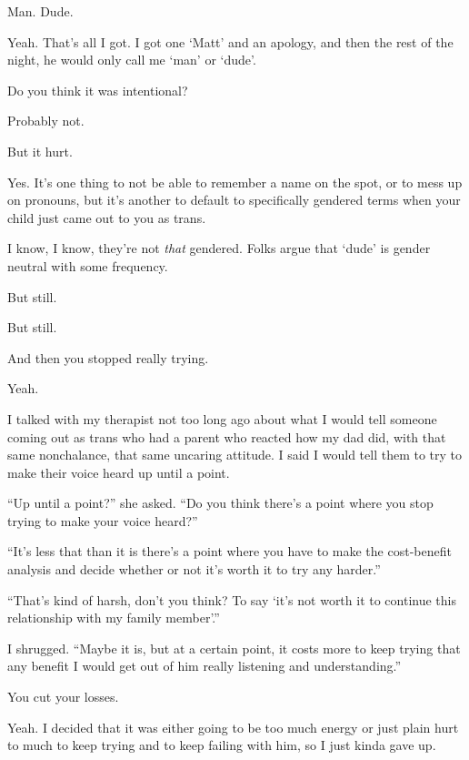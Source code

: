 \begin{paracol}{2}
\begin{leftcolumn}
\begin{ally}
Man. Dude.
\end{ally}
Yeah. That's all I got. I got one `Matt' and an apology, and then the rest of the night, he would only call me `man' or `dude'.

\begin{ally}
Do you think it was intentional?
\end{ally}
Probably not.

\begin{ally}
But it hurt.
\end{ally}
Yes. It's one thing to not be able to remember a name on the spot, or to mess up on pronouns, but it's another to default to specifically gendered terms when your child just came out to you as trans.

I know, I know, they're not \emph{that} gendered. Folks argue that `dude' is gender neutral with some frequency.

\begin{ally}
But still.
\end{ally}
But still.

\begin{ally}
And then you stopped really trying.
\end{ally}
Yeah.

I talked with my therapist not too long ago about what I would tell someone coming out as trans who had a parent who reacted how my dad did, with that same nonchalance, that same uncaring attitude. I said I would tell them to try to make their voice heard up until a point.

``Up until a point?'' she asked. ``Do you think there's a point where you stop trying to make your voice heard?''

``It's less that than it is there's a point where you have to make the cost-benefit analysis and decide whether or not it's worth it to try any harder.''

``That's kind of harsh, don't you think? To say `it's not worth it to continue this relationship with my family member'.''

I shrugged. ``Maybe it is, but at a certain point, it costs more to keep trying that any benefit I would get out of him really listening and understanding.''

\begin{ally}
You cut your losses.
\end{ally}
Yeah. I decided that it was either going to be too much energy or just plain hurt to much to keep trying and to keep failing with him, so I just kinda gave up.


\end{leftcolumn}
\end{paracol}

